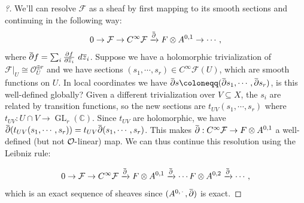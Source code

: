 \begin{proof}[?]

We'll can resolve \(\mathcal{F}\) as a sheaf by first mapping to its
smooth sections and continuing in the following way:
\begin{align*}
0 \to \mathcal{F} \to C^{\infty } \mathcal{F} \xrightarrow{\mkern 1.5mu\overline{\mkern-1.5mu{\partial}\mkern-1.5mu}\mkern 1.5mu} F \otimes A^{0, 1} \to \cdots
,\end{align*}
where
\(\mkern 1.5mu\overline{\mkern-1.5mu{\partial}\mkern-1.5mu}\mkern 1.5muf = \sum_i {\frac{\partial f}{\partial {\overline{{z}}}_i}\,} \, d{\overline{{z}}}_i\).
Suppose we have a holomorphic trivialization of
\({ \left.{{\mathcal{F} }} \right|_{{U}} } \cong {\mathcal{O}}_{U}^{\oplus r}\)
and we have sections
\((s_1, \cdots, s_r) \in C^{\infty } \mathcal{F}(U)\), which are smooth
functions on \(U\). In local coordinates we have
\(\mkern 1.5mu\overline{\mkern-1.5mu{\partial}\mkern-1.5mu}\mkern 1.5mus \coloneqq(\mkern 1.5mu\overline{\mkern-1.5mu{\partial}\mkern-1.5mu}\mkern 1.5mus_1, \cdots, \mkern 1.5mu\overline{\mkern-1.5mu{\partial}\mkern-1.5mu}\mkern 1.5mus_r)\),
is this well-defined globally? Given a different trivialization over
\(V \subseteq X\), the \(s_i\) are related by transition functions, so
the new sections are \(t_{UV}(s_1, \cdots, s_r)\) where
\(t_{UV}: U \cap V \to \operatorname{GL}_r({\mathbb{C}})\). Since
\(t_{UV}\) are holomorphic, we have
\(\mkern 1.5mu\overline{\mkern-1.5mu{\partial}\mkern-1.5mu}\mkern 1.5mu( t_{UV} (s_1, \cdots, s_r)) = t_{UV} \mkern 1.5mu\overline{\mkern-1.5mu{\partial}\mkern-1.5mu}\mkern 1.5mu(s_1, \cdots, s_r)\).
This makes
\(\mkern 1.5mu\overline{\mkern-1.5mu{\partial}\mkern-1.5mu}\mkern 1.5mu: C^{\infty } \mathcal{F} \to F\otimes A^{0, 1}\)
a well-defined (but not \({\mathcal{O}}{\hbox{-}}\)linear) map. We can
thus continue this resolution using the Leibniz rule:

\begin{align*}
0 \to \mathcal{F} \to C^{\infty } \mathcal{F} \xrightarrow{\mkern 1.5mu\overline{\mkern-1.5mu{\partial}\mkern-1.5mu}\mkern 1.5mu} F \otimes A^{0, 1} \xrightarrow{\mkern 1.5mu\overline{\mkern-1.5mu{\partial}\mkern-1.5mu}\mkern 1.5mu} \cdots F \otimes A^{0, 2} \xrightarrow{\mkern 1.5mu\overline{\mkern-1.5mu{\partial}\mkern-1.5mu}\mkern 1.5mu} \cdots
,\end{align*}
which is an exact sequence of sheaves since
\((A^{0, {\,\cdot\,}}, \mkern 1.5mu\overline{\mkern-1.5mu{\partial}\mkern-1.5mu}\mkern 1.5mu)\)
is exact.


\end{proof}
